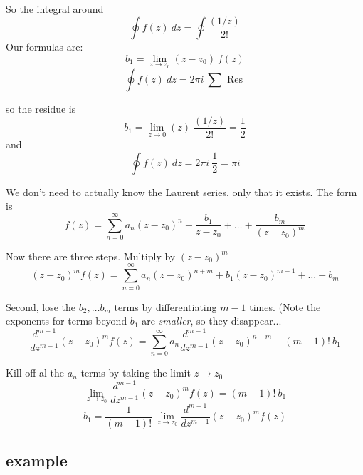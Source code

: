 \documentclass[11pt, oneside]{article}
\begin{document}
So the integral around 
\[ \oint f(z) \ dz = \oint \frac{(1/z)}{2!} \]
Our formulas are:
\[ b_1 = \lim_{z \rightarrow z_0} (z-z_0) \ f(z)  \]
\[ \oint f(z) \ dz = 2 \pi i \ \sum \text{ Res } \]

so the residue is
\[ b_1 = \lim_{z \rightarrow 0} (z) \ \frac{(1/z)}{2!} = \frac{1}{2} \]
and
\[ \oint f(z) \ dz = 2 \pi i \ \frac{1}{2} = \pi i \]

We don't need to actually know the Laurent series, only that it exists.  The form is
\[ f(z) = \sum_{n=0}^{\infty} a_n(z-z_0)^n + \frac{b_1}{z-z_0} + \dots + \frac{b_m}{(z-z_0)^m} \]

Now there are three steps.  Multiply by $(z - z_0)^m$
\[ (z - z_0)^m f(z) = \sum_{n=0}^{\infty} a_n(z-z_0)^{n+m} + b_1 (z-z_0)^{m-1} + \dots + b_m \]

Second, lose the $b_2, \dots b_m$ terms by differentiating $m-1$ times.  (Note the exponents for terms beyond $b_1$ are \emph{smaller}, so they disappear...
\[ \frac{d^{m-1}}{dz^{m-1}} (z-z_0)^m f(z) = \sum_{n=0}^{\infty} a_n\frac{d^{m-1}}{dz^{m-1}}  (z-z_0)^{n+m} + (m-1)! \ b_1 \]

Kill off al the $a_n$ terms by taking the limit $z \rightarrow z_0$
\[ \lim_{z \rightarrow z_0}  \frac{d^{m-1}}{dz^{m-1}} (z-z_0)^m f(z) = (m-1)! \ b_1 \]
\[ b_1 = \frac{1}{(m-1)!} \ \lim_{z \rightarrow z_0}  \frac{d^{m-1}}{dz^{m-1}} (z-z_0)^m f(z) \]

\subsection*{example}
\end{document}
